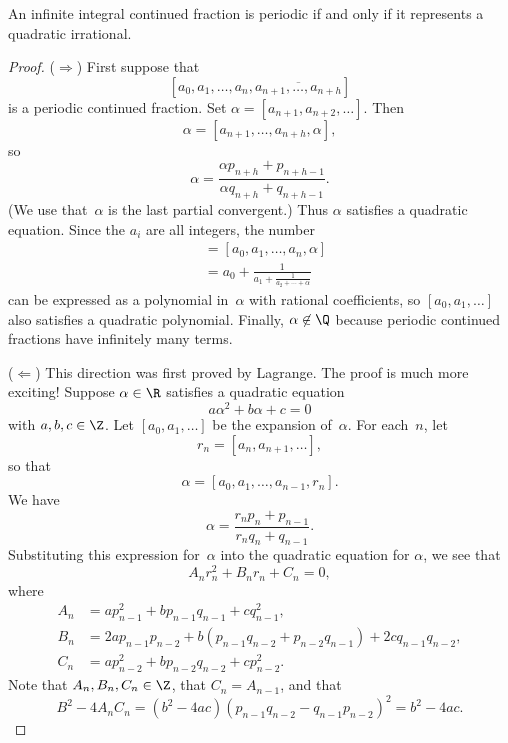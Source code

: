 \documentclass[11pt]{report}
\begin{document}
\begin{theorem}
  An infinite integral continued fraction is periodic if and only if
  it represents a quadratic irrational.
\end{theorem}
\begin{proof}
  \par\noindent($\Longrightarrow$) First suppose that
  $$[a_0, a_1, \ldots, a_n, \overline{a_{n+1},\ldots, a_{n+h}}]$$
  is a periodic continued fraction.  Set
  $\alpha=[a_{n+1},a_{n+2}, \ldots]$.  Then
  $$
    \alpha = [a_{n+1},\ldots, a_{n+h}, \alpha],
  $$
  so
  $$
    \alpha = \frac{\alpha p_{n+h} + p_{n+h-1}}{\alpha q_{n+h} + q_{n+h-1}}.
  $$
  (We use that~$\alpha$ is the last partial convergent.)
  Thus $\alpha$ satisfies a quadratic equation.  Since the $a_i$ are
  all integers, the number
  \begin{align*}
    [a_0, a_1, \ldots ] & = [a_0, a_1, \ldots, a_n, \alpha]                       \\
                        & = a_0 + \frac{1}{a_1 + \frac{1}{a_2 + \cdots + \alpha}}
  \end{align*}
  can be expressed as a polynomial in~$\alpha$ with
  rational coefficients, so
  $[a_0, a_1, \ldots]$ also satisfies a quadratic polynomial.
  Finally, $\alpha\not\in\Q$ because periodic continued fractions
  have infinitely many terms.
  \vspace{2ex}

  \par\noindent($\Longleftarrow$)
  This direction was first proved by Lagrange.  The proof
  is much more exciting!
  Suppose $\alpha\in\R$ satisfies a quadratic equation
  $$a \alpha^2 + b\alpha + c = 0$$
  with $a, b, c\in\Z$.
  Let $[a_0, a_1, \ldots]$
  be the expansion of~$\alpha$.  For each~$n$, let
  $$
    r_n = [a_n, a_{n+1}, \ldots],
  $$
  so that
  $$
    \alpha = [a_0, a_1, \ldots, a_{n-1}, r_n].
  $$
  We have
  $$
    \alpha = \frac{r_n p_n + p_{n-1}}{r_n q_n + q_{n-1}}.
  $$
  Substituting this expression for~$\alpha$ into the quadratic equation
  for $\alpha$, we see that
  $$A_n r_n^2 + B_n r_n + C_n = 0,$$
  where
  \begin{align*}
    A_n & = a p_{n-1}^2 + b p_{n-1} q_{n-1} + c q_{n-1}^2,                                  \\
    B_n & = 2a p_{n-1} p_{n-2} + b(p_{n-1} q_{n-2} + p_{n-2} q_{n-1}) + 2c q_{n-1} q_{n-2}, \\
    C_n & = a p_{n-2}^2 + b p_{n-2} q_{n-2} + c p_{n-2}^2.
  \end{align*}
  Note that $A_n, B_n, C_n\in\Z$, that $C_n = A_{n-1}$, and that
  $$
    B^2 - 4A_n C_n = (b^2- 4ac)(p_{n-1}q_{n-2} - q_{n-1}p_{n-2})^2 = b^2 - 4ac.
  $$


\end{proof}
\end{document}
